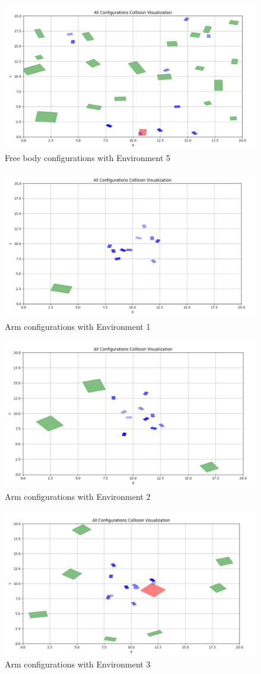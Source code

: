 \documentclass{article}
\begin{document}
\begin{figure} [H]
    \centering
    \includegraphics[width=0.7\linewidth]{latex_media/config_collision_freebody_env5.png}
    \caption{Free body configurations with Environment 5}
\end{figure}

\begin{figure} [H]
    \centering
    \includegraphics[width=0.7\linewidth]{latex_media/config_collision_arm_env1.png}
    \caption{Arm configurations with Environment 1}
\end{figure}

\begin{figure} [H]
    \centering
    \includegraphics[width=0.7\linewidth]{latex_media/config_collision_arm_env2.png}
    \caption{Arm configurations with Environment 2}
\end{figure}

\begin{figure} [H]
    \centering
    \includegraphics[width=0.7\linewidth]{latex_media/config_collision_arm_env3.png}
    \caption{Arm configurations with Environment 3}
\end{figure}
\end{document}
